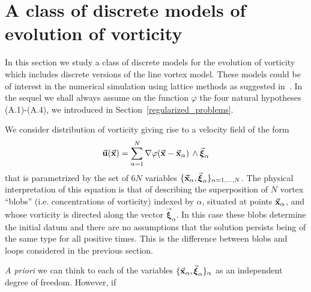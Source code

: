 \documentclass[a4paper,11pt]{article}
\numberwithin{equation}{section}
\DeclareMathOperator{\curl}{curl}
\newtheorem{remark}{Remark}
\newcommand{\U}{\mbox{$\vec{\bf u}$}}
\newcommand{\vomega}{\mbox{$\vec{\boldsymbol\omega}$}}
\newcommand{\x}{\mbox{$\vec{\bf x}$}}
\newcommand{\bxi}{\mbox{$\vec{\boldsymbol \xi}$}}
\begin{document}
\section{A class of discrete models of evolution of vorticity}
\label{discrete} 
In this section we study a class of discrete models for the evolution
of vorticity which includes discrete versions of the line vortex model.
These models could be of interest in the numerical simulation using
lattice methods as suggested in~\cite{MR95m:76043}. In the sequel we
shall always assume on the function $\varphi$ the four natural
hypotheses (A.1)-(A.4), we introduced in
Section~\ref{regularized_problems}.\par 
%
We consider distribution of vorticity giving rise to a velocity
field of the form
\begin{equation*}%
\U(\x) = \sum_{\alpha=1}^N \nabla \varphi(\x - \x_\alpha)\,\wedge
\bxi_\alpha 
\end{equation*}
that is parametrized by the set of $6N$ variables
$\{\x_\alpha,\bxi_\alpha\}_{\alpha=1,\dots,N}$. The physical
interpretation of this equation is that of describing the
superposition of $N$ vortex ``blobs'' (i.e. concentrations of
vorticity) indexed by $\alpha$, situated at points $\x_\alpha$, and
whose vorticity is directed along the vector $\bxi_\alpha$. In this
case these blobs determine the initial datum and there are no
assumptions that the solution persists being of the same type for
all positive times. This is the difference between blobs and loops
considered in the previous section.\par
%
%
\textit{A priori} we can think to each of the variables $\{\x_\alpha,
\bxi_\alpha\}_\alpha$ as an independent degree of freedom. However, if
\end{document}
